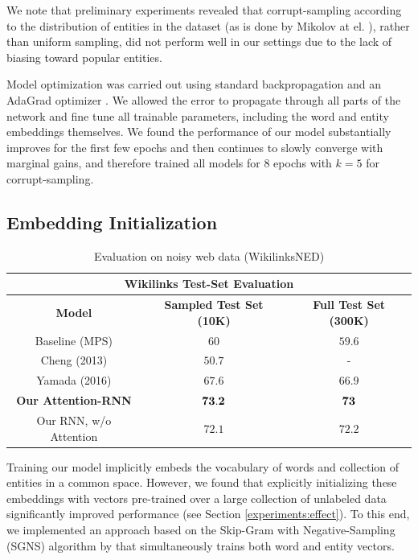 \documentclass[11pt,a4paper]{article}
\begin{document}
	We note that preliminary experiments revealed that corrupt-sampling according to the distribution of entities in the dataset (as is done by Mikolov at el. ), rather than uniform sampling, did not perform well in our settings due to the lack of biasing toward popular entities.
	
	Model optimization was carried out using standard backpropagation and an AdaGrad optimizer \cite{duchi2011adaptive}. We allowed the error to propagate through all parts of the network and fine tune all trainable parameters, including the word and entity embeddings themselves. We found the performance of our model substantially improves for the first few epochs and then continues to slowly converge with marginal gains, and therefore trained all models for $8$ epochs with $k=5$ for corrupt-sampling. 
	
	\subsection{Embedding Initialization}
	
	\begin{table}[t]
		\begin{center}
			\begin{tabular}{|c| c | c | }
				\hline \multicolumn{3}{|c|}{Wikilinks Test-Set Evaluation} \\
				\hline \bf Model               & \bf Sampled Test Set (10K)  & \bf Full Test Set (300K)  \\
				\hline Baseline (MPS)                 & $60$   & $59.6$ \\
				Cheng (2013)                   & $50.7$ & - \\
				Yamada (2016)              & $67.6$ & $66.9$ \\
				\hline
				\bf Our Attention-RNN              & $\bf 73.2$ & $\bf 73$ \\
				Our RNN, w/o Attention         & $72.1$   & $72.2$ \\
				\hline
			\end{tabular}
		\end{center}
		\caption{\label{tab:wikilink} Evaluation on noisy web data (WikilinksNED)}
	\end{table}
	
	Training our model implicitly embeds the vocabulary of words and collection of entities in a common space. However, we found that explicitly initializing these embeddings with vectors pre-trained over a large collection of unlabeled data significantly improved performance (see Section \ref{experiments:effect}). To this end, we implemented an approach based on the Skip-Gram with Negative-Sampling (SGNS) algorithm by  that simultaneously trains both word and entity vectors.
	
\end{document}
